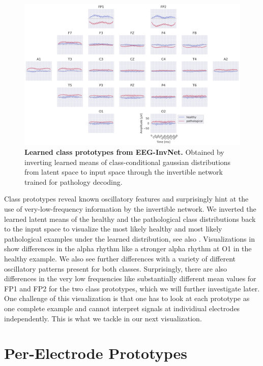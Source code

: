 \begin{figure}[htb]
    \myfloatalign
    \includegraphics[width=1\linewidth]{images/net-disc-prototypes.png}
    \caption[Learned class prototypes from EEG-InvNet]{
\textbf{Learned class prototypes from EEG-InvNet.} Obtained by inverting
learned means of class-conditional gaussian distributions from latent
space to input space through the invertible network trained for
pathology decoding.
}
\label{disc-invnet-prototypes}
\end{figure}



    Class prototypes reveal known oscillatory features and surprisingly hint
at the use of very-low-frequency information by the invertible network.
We inverted the learned latent means of the healthy and the pathological
class distributions back to the input space to visualize the most likely
healthy and most likely pathological examples under the learned
distribution, see also .
Visualizations in  show
differences in the alpha rhythm like a stronger alpha rhythm at O1 in
the healthy example. We also see further differences with a variety of
different oscillatory patterns present for both classes. Surprisingly,
there are also differences in the very low frequencies like
substantially different mean values for FP1 and FP2 for the two class
prototypes, which we will further investigate later. One challenge of
this visualization is that one has to look at each prototype as one
complete example and cannot interpret signals at individiual electrodes
independently. This is what we tackle in our next visualization.

\section{Per-Electrode Prototypes}\label{per-channel-prototypes}

